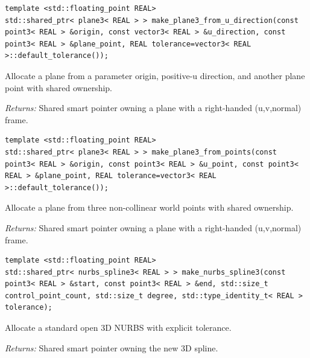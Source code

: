 \par\noindent\begin{minipage}{\linewidth}
\begin{lstlisting}[style=apireference]
template <std::floating_point REAL>
std::shared_ptr< plane3< REAL > > make_plane3_from_u_direction(const point3< REAL > &origin, const vector3< REAL > &u_direction, const point3< REAL > &plane_point, REAL tolerance=vector3< REAL >::default_tolerance());
\end{lstlisting}
{\footnotesize Allocate a plane from a parameter origin, positive-u direction, and another plane point with shared ownership.\par}
{\footnotesize\textit{Returns:} Shared smart pointer owning a plane with a right-handed (u,v,normal) frame.\par}
\end{minipage}\par\vspace{1pt}
\par\noindent\begin{minipage}{\linewidth}
\begin{lstlisting}[style=apireference]
template <std::floating_point REAL>
std::shared_ptr< plane3< REAL > > make_plane3_from_points(const point3< REAL > &origin, const point3< REAL > &u_point, const point3< REAL > &plane_point, REAL tolerance=vector3< REAL >::default_tolerance());
\end{lstlisting}
{\footnotesize Allocate a plane from three non-collinear world points with shared ownership.\par}
{\footnotesize\textit{Returns:} Shared smart pointer owning a plane with a right-handed (u,v,normal) frame.\par}
\end{minipage}\par\vspace{1pt}
\par\noindent\begin{minipage}{\linewidth}
\begin{lstlisting}[style=apireference]
template <std::floating_point REAL>
std::shared_ptr< nurbs_spline3< REAL > > make_nurbs_spline3(const point3< REAL > &start, const point3< REAL > &end, std::size_t control_point_count, std::size_t degree, std::type_identity_t< REAL > tolerance);
\end{lstlisting}
{\footnotesize Allocate a standard open 3D NURBS with explicit tolerance.\par}
{\footnotesize\textit{Returns:} Shared smart pointer owning the new 3D spline.\par}
\end{minipage}\par\vspace{1pt}
